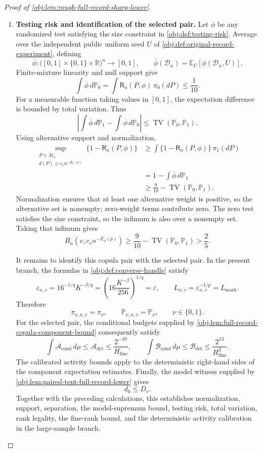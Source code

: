 \documentclass[11pt]{article}
\begin{document}
\begin{proof}[Proof of \cref{obj:lem:rough-full-record-sharp-lower}]
\begin{enumerate}
\item \textbf{Testing risk and identification of the selected pair.}
Let \(\phi\) be any randomized test satisfying the size constraint in
\cref{obj:def:testing-risk}. Average over the independent public uniform seed \(U\) of
\cref{obj:def:original-record-experiment}, defining
\[
\overline\phi:
\bigl([0,1]\times\{0,1\}\times\mathbb R\bigr)^n
\longrightarrow[0,1],
\qquad
\overline\phi(\mathcal D_n)
=
\mathbb E_U[\phi(\mathcal D_n,U)].
\]
Finite-mixture linearity and null support give
\[
\int\overline\phi\,d\mathbb P_0
=
\int\mathsf R_n(P,\phi)\,\pi_0(dP)
\le\frac1{10}.
\]
For a measurable function taking values in \([0,1]\), the expectation difference is bounded by total variation. Thus
\[
\left|
\int\overline\phi\,d\mathbb P_1
-
\int\overline\phi\,d\mathbb P_0
\right|
\le\operatorname{TV}(\mathbb P_0,\mathbb P_1).
\]
Using alternative support and normalization,
\[
\begin{aligned}
\sup_{\substack{P\in\mathcal M_v\\
d(P)\ge c_vn^{-E_4(p)}}}
\{1-\mathsf R_n(P,\phi)\}
&\ge
\int\{1-\mathsf R_n(P,\phi)\}\,\pi_1(dP)\\
&=
1-\int\overline\phi\,d\mathbb P_1\\
&\ge
\frac9{10}-\operatorname{TV}(\mathbb P_0,\mathbb P_1).
\end{aligned}
\]
Normalization ensures that at least one alternative weight is positive, so the alternative set is nonempty; zero-weight terms contribute zero. The zero test satisfies the size constraint, so the infimum is also over a nonempty set. Taking that infimum gives
\[
B_n\!\left(v,c_vn^{-E_4(p)}\right)
\ge
\frac9{10}-\operatorname{TV}(\mathbb P_0,\mathbb P_1)
>\frac25.
\]

It remains to identify this copula pair with the selected pair. In the present branch, the formulas in
\cref{obj:def:converse-handle} satisfy
\[
\varepsilon_{n,v}
=
16^{-1/q}K^{-\beta/q}
=
\left(16\frac{K^{-\beta}}{256}\right)^{1/q}
=\varepsilon,
\qquad
L_{n,v}=\varepsilon_{n,v}^{-1/p}=L_{\mathrm{mark}}.
\]
Therefore
\[
\pi_{\nu,n,v}=\pi_\nu,
\qquad
\mathbb P_{\nu,n,v}=\mathbb P_\nu,
\qquad \nu\in\{0,1\}.
\]
For the selected pair, the conditional budgets supplied by
\cref{obj:lem:full-record-copula-component-bound} consequently satisfy
\[
\int\mathcal A_{\mathrm{cond}}\,d\mu
\le\mathcal A_{\mathrm{det}}
\le\frac{2^{-10}}{H_{\mathrm{fine}}},
\qquad
\int\mathcal B_{\mathrm{cond}}\,d\mu
\le\mathcal B_{\mathrm{det}}
\le\frac{2^{13}}{H_{\mathrm{fine}}^2}.
\]
The calibrated activity bounds apply to the deterministic right-hand sides of the component expectation estimates.
Finally, the model witness supplied by
\cref{obj:lem:paired-tent-full-record-lower} gives
\[
d_0\le D_v.
\]
Together with the preceding calculations, this establishes normalization, support, separation, the model-supremum bound, testing risk, total variation, rank legality, the fine-rank bound, and the deterministic activity calibration in the large-sample branch.


\end{enumerate}
\end{proof}
\end{document}
